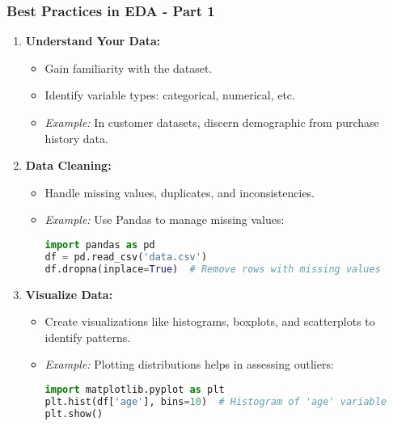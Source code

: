 \documentclass[aspectratio=169]{beamer}
\begin{document}
\begin{frame}[fragile]
    \frametitle{Best Practices in EDA - Part 1}
    \begin{enumerate}
        \item \textbf{Understand Your Data:}
        \begin{itemize}
            \item Gain familiarity with the dataset.
            \item Identify variable types: categorical, numerical, etc.
            \item \textit{Example:} In customer datasets, discern demographic from purchase history data.
        \end{itemize}

        \item \textbf{Data Cleaning:}
        \begin{itemize}
            \item Handle missing values, duplicates, and inconsistencies.
            \item \textit{Example:} Use Pandas to manage missing values:
            \begin{lstlisting}[language=Python]
import pandas as pd
df = pd.read_csv('data.csv')
df.dropna(inplace=True)  # Remove rows with missing values
            \end{lstlisting}
        \end{itemize}

        \item \textbf{Visualize Data:}
        \begin{itemize}
            \item Create visualizations like histograms, boxplots, and scatterplots to identify patterns.
            \item \textit{Example:} Plotting distributions helps in assessing outliers:
            \begin{lstlisting}[language=Python]
import matplotlib.pyplot as plt
plt.hist(df['age'], bins=10)  # Histogram of 'age' variable
plt.show()
            \end{lstlisting}
        \end{itemize}
    \end{enumerate}
\end{frame}
\end{document}
